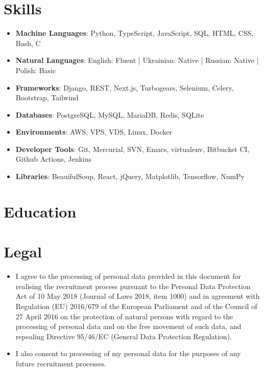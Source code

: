 \section{Skills}
\begin{itemize}
\item \textbf{Machine Languages}:  Python, TypeScript, JavaScript, SQL, HTML, CSS, Bash, C
\item \textbf{Natural Languages}:  English: Fluent | Ukrainian: Native | Russian: Native | Polish: Basic
\item \textbf{Frameworks}: Django, REST, Next.js, Turbogears, Selenium, Celery, Bootstrap, Tailwind
\item \textbf{Databases}: PostgreSQL, MySQL, MariaDB, Redis, SQLite
\item \textbf{Environments}: AWS, VPS, VDS, Linux, Docker
\item \textbf{Developer Tools}: Git, Mercurial, SVN, Emacs, virtualenv, Bitbucket CI, Github Actions, Jenkins
\item \textbf{Libraries}: BeauifulSoup, React, jQuery, Matplotlib, Tensorflow, NumPy
\end{itemize}

\section{Education}

\section{Legal}
\begin{itemize}
\item I agree to the processing of personal data provided in this document for realising the recruitment process pursuant to the Personal Data Protection Act of 10 May 2018 (Journal of Laws 2018, item 1000) and in agreement with Regulation (EU) 2016/679 of the European Parliament and of the Council of 27 April 2016 on the protection of natural persons with regard to the processing of personal data and on the free movement of such data, and repealing Directive 95/46/EC (General Data Protection Regulation).
\item I also consent to processing of my personal data for the purposes of any future recruitment processes.
\end{itemize}




